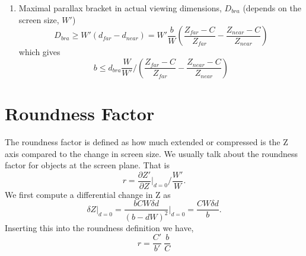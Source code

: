 \documentclass[12pt,a4paper]{article}
\begin{document}
\begin{enumerate}
  \item Maximal parallax bracket  in actual viewing dimensions, $D_{bra}$ (depends on the screen size, $W'$)
 \begin{equation}
 D_{bra} \geq W'(d_{far} - d_{near}) = W' \frac{b}{W} \left(\frac{Z_{far} - C}{Z_{far}} - \frac{Z_{near} - C}{Z_{near}} \right)
 \end{equation}
 which gives
 \begin{equation}
 b \leq d_{bra} \frac{W}{W'} \bigg/ \left( \frac{Z_{far} - C}{Z_{far}} - \frac{Z_{near} - C}{Z_{near}} \right)
 \end{equation}
 
\end{enumerate}



\section{Roundness Factor}
The roundness factor is defined as how much extended or compressed is the Z axis compared to the change in screen size.  We usually talk about the roundness factor for objects at the screen plane. That is
\begin{equation}
 r = \frac{\partial Z'}{\partial Z}\Big|_{d=0} \Bigg/  \frac{W'}{W}.
\end{equation}
We first compute a differential change in Z as
\begin{equation}
  \delta Z |_{d=0} = \frac{bCW \delta d}{(b - dW)^2} \Big|_{d=0} = \frac{C W\delta d}{b}.
\end{equation}
Inserting this into the roundness definition we have,
\begin{equation}
 r = \frac{C'}{b'} \ \frac{b}{C}
\end{equation}
\end{document}
